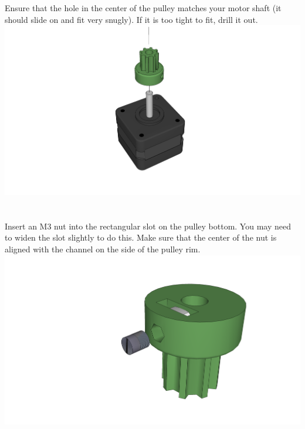 \documentclass[twoside,openany,a4paper,titlepage]{memoir}
\begin{document}
	\section{}
	Ensure that the hole in the center of the pulley matches your motor shaft (it should slide on and fit very
	snugly). If it is too tight to fit, drill it out.\\
	\includegraphics[width=1\linewidth]{graphics/ch9_1.png}
	
	\section{}
	Insert an M3 nut into the rectangular slot on the pulley bottom. You may need to widen the slot slightly
	to do this. Make sure that the center of the nut is aligned with the channel on the side of the pulley rim.\\
	\includegraphics[width=1\linewidth]{graphics/ch9_2.png}
	
\end{document}
